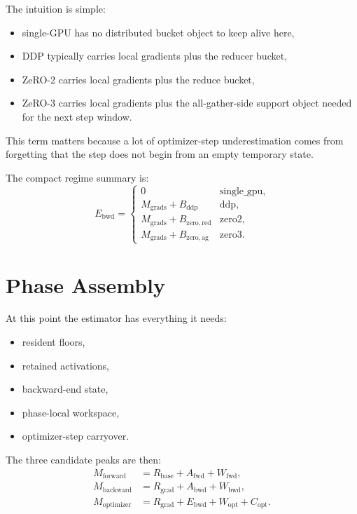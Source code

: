 The intuition is simple:
\begin{itemize}[leftmargin=1.5em]
\item single-GPU has no distributed bucket object to keep alive here,
\item DDP typically carries local gradients plus the reducer bucket,
\item ZeRO-2 carries local gradients plus the reduce bucket,
\item ZeRO-3 carries local gradients plus the all-gather-side support object
needed for the next step window.
\end{itemize}

This term matters because a lot of optimizer-step underestimation comes from
forgetting that the step does not begin from an empty temporary state.

The compact regime summary is:
\[
E_{\mathrm{bwd}} =
\begin{cases}
0 & \text{single\_gpu}, \\
M_{\mathrm{grads}} + B_{\mathrm{ddp}} & \text{ddp}, \\
M_{\mathrm{grads}} + B_{\mathrm{zero,red}} & \text{zero2}, \\
M_{\mathrm{grads}} + B_{\mathrm{zero,ag}} & \text{zero3}.
\end{cases}
\]

\section{Phase Assembly}
At this point the estimator has everything it needs:
\begin{itemize}[leftmargin=1.5em]
\item resident floors,
\item retained activations,
\item backward-end state,
\item phase-local workspace,
\item optimizer-step carryover.
\end{itemize}

The three candidate peaks are then:
\begin{align*}
M_{\mathrm{forward}} &= R_{\mathrm{base}} + A_{\mathrm{fwd}} + W_{\mathrm{fwd}}, \\
M_{\mathrm{backward}} &= R_{\mathrm{grad}} + A_{\mathrm{bwd}} + W_{\mathrm{bwd}}, \\
M_{\mathrm{optimizer}} &=
R_{\mathrm{grad}} + E_{\mathrm{bwd}} + W_{\mathrm{opt}} + C_{\mathrm{opt}}.
\end{align*}

